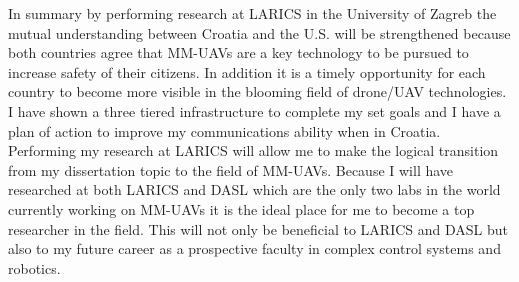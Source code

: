 \documentclass[12pt]{article}
\begin{document}
In summary by performing research at LARICS in the University of Zagreb the mutual understanding between Croatia and the U.S. will be strengthened because both countries agree that MM-UAVs are a key technology to be pursued to increase safety of their citizens.
In addition it is a timely opportunity for each country to become more visible in the blooming field of drone/UAV technologies.  
I have shown a three tiered infrastructure to complete my set goals and I have a plan of action to improve my communications ability when in Croatia.
Performing my research at LARICS will allow me to make the logical transition from my dissertation topic to the field of MM-UAVs.  
Because I will have researched at both LARICS and DASL which are the only two labs in the world currently working on MM-UAVs it is the ideal place for me to become a top researcher in the field.
This will not only be beneficial to LARICS and DASL but also to my future career as a prospective faculty in complex control systems and robotics.
\end{document}
